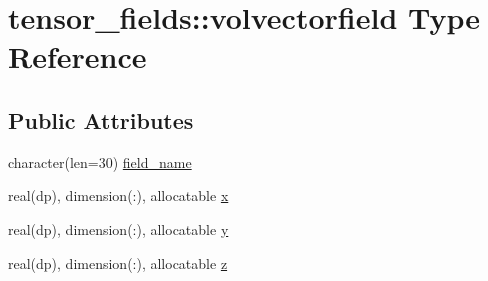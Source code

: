 \hypertarget{structtensor__fields_1_1volvectorfield}{\section{tensor\-\_\-fields\-:\-:volvectorfield Type Reference}
\label{structtensor__fields_1_1volvectorfield}
}
\subsection*{Public Attributes}
\begin{DoxyCompactItemize}
\item 
character(len=30) \hyperlink{structtensor__fields_1_1volvectorfield_aa5650124a4287704697a743007493597}{field\-\_\-name}
\item 
real(dp), dimension(\-:), allocatable \hyperlink{structtensor__fields_1_1volvectorfield_ae8ed0d16b6fab2c74f8b90d61e2d62e0}{x}
\item 
real(dp), dimension(\-:), allocatable \hyperlink{structtensor__fields_1_1volvectorfield_a06531f83731fd322e2d8be103b85f6bc}{y}
\item 
real(dp), dimension(\-:), allocatable \hyperlink{structtensor__fields_1_1volvectorfield_a08400888d02a55a3e4a82b2c94d71068}{z}
\end{DoxyCompactItemize}


